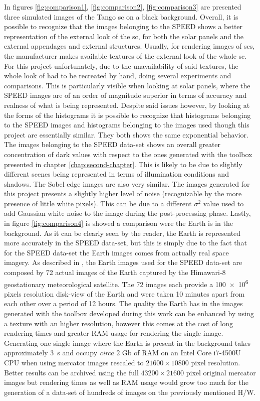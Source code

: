 In figures \ref{fig:comparison1}, \ref{fig:comparison2}, \ref{fig:comparison3} are presented three simulated images of the Tango \acrshort{sc} on a black background.
Overall, it is possible to recognize that the images belonging to the SPEED shows a better representation of the external look of the \acrshort{sc}, for both the solar panels and the external appendages and external structures. Usually, for rendering images of \acrshort{sc}s, the manufacturer makes available textures of the external look of the whole \acrshort{sc}. For this project unfortunately, due to the unavailability of said textures, the whole look of had to be recreated by hand, doing several experiments and comparisons. This is particularly visible when looking at solar panels, where the SPEED images are of an order of magnitude superior in terms of accuracy and realness of what is being represented.
Despite said issues however, by looking at the forms of the histograms it is possible to recognize that histograms belonging to the SPEED images and histograms belonging to the images used though this project are essentially similar. They both shows the same exponential behavior. The images belonging to the SPEED data-set shows an overall greater concentration of dark values with respect to the ones generated with the toolbox presented in chapter \ref{chap:second-chapter}. This is likely to be due to slightly different scenes being represented in terms of illumination conditions and shadows.
The Sobel edge images are also very similar. The images generated for this project presents a slightly higher level of noise (recognizable by the more presence of little white pixels). This can be due to a different $\sigma^2$ value used to add Gaussian white noise to the image during the post-processing phase.
Lastly, in figure \ref{fig:comparison4} is showed a comparison were the Earth is in the background. As it can be clearly seen by the reader, the Earth is represented more accurately in the SPEED data-set, but this is simply due to the fact that for the SPEED data-set the Earth images comes from actually real space imagery. As described in \cite{Sharma2019}, the Earth images used for the SPEED data-set are composed by 72 actual images of the Earth captured by the Himawari-8 geostationary meteorological satellite. The 72 images each provide a \num{100e6} pixels resolution disk-view of the Earth and were taken 10 minutes apart from each other over a period of 12 hours. The quality the Earth has in the images generated with the toolbox developed during this work can be enhanced by using a texture with an higher resolution, however this comes at the cost of long rendering times and greater RAM usage for rendering the single image. Generating one single image where the Earth is present in the background takes approximately \SI{3}{\s} and occupy \textit{circa} $2$ Gb of RAM on an Intel Core i7-4500U CPU when using mercator images rescaled to $21600 \times 10800$ pixel resolution. Better results can be archived using the full $43200 \times 21600$ pixel original mercator images but rendering times as well as RAM usage would grow too much for the generation of a data-set of hundreds of images on the previously mentioned H/W.

